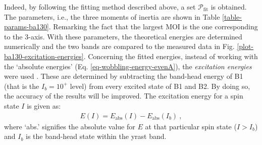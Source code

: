 Indeed, by following the fitting method described above, a set $\mathcal{P}_\text{fit}$ is obtained. The parameters, i.e., the three moments of inertia are shown in Table \ref{table-params-ba130}. Remarking the fact that the largest MOI is the one corresponding to the $3$-axis. With these parameters, the theoretical energies are determined numerically and the two bands are compared to the measured data in Fig. \ref{plot-ba130-excitation-energies}. Concerning the fitted energies, instead of working with the `absolute energies' (Eq. \ref{eq-wobbling-energy-evenA}), the \emph{excitation energies} were used \cite{raduta2017semiclassical,raduta2018wobbling,raduta2020towards}. These are determined by subtracting the band-head energy of B1 (that is the $I_b=10^+$ level) from every excited state of B1 and B2. By doing so, the accuracy of the results will be improved. The excitation energy for a spin state $I$ is given as:
\begin{align}
    E(I)=E_\text{abs}(I)-E_\text{abs}(I_b)\ ,
    \label{excitation-energy-general-formula}
\end{align}
where `abs.' signifies the absolute value for $E$ at that particular spin state ($I>I_b$) and $I_b$ is the band-head state within the yrast band.
\begin{table}
    \centering
    \caption{The parameter set $\mathcal{P}_\text{fit}$ obtained from the fitting procedure of the excitation energies of the two wobbling bands (B1 and B2) for $^{130}$Ba. The model function corresponds to the energy of a simple wobbler (see Eq. \ref{eq-wobbling-energy-evenA}).}
    \label{table-params-ba130}
\end{table}
